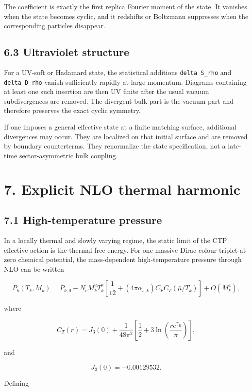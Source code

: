 \documentclass[
  10pt,
  a4paper,
]{article}
\begin{document}
The coefficient is exactly the first replica Fourier moment of the
state. It vanishes when the state becomes cyclic, and it redshifts or
Boltzmann suppresses when the corresponding particles disappear.

\subsection{6.3 Ultraviolet structure}\label{ultraviolet-structure}

For a UV-soft or Hadamard state, the statistical additions
\texttt{delta\ S\_rho} and \texttt{delta\ D\_rho} vanish sufficiently
rapidly at large momentum. Diagrams containing at least one such
insertion are then UV finite after the usual vacuum subdivergences are
removed. The divergent bulk part is the vacuum part and therefore
preserves the exact cyclic symmetry.

If one imposes a general effective state at a finite matching surface,
additional divergences may occur. They are localized on that initial
surface and are removed by boundary counterterms. They renormalize the
state specification, not a late-time sector-asymmetric bulk coupling.

\section{7. Explicit NLO thermal
harmonic}\label{explicit-nlo-thermal-harmonic}

\subsection{7.1 High-temperature
pressure}\label{high-temperature-pressure}

In a locally thermal and slowly varying regime, the static limit of the
CTP effective action is the thermal free energy. For one massive Dirac
colour triplet at zero chemical potential, the mass-dependent
high-temperature pressure through NLO can be written

\[
P_k(T_k,M_k)
=
P_{k,0}
-
N_cM_k^2T_k^2
\left[
\frac1{12}
+
(4\pi\alpha_{s,k})C_F C_T(\bar\mu/T_k)
\right]
+
O(M_k^4),
\]

where

\[
C_T(r)
=
J_3(0)
+
\frac{1}{48\pi^2}
\left[
\frac12+3\ln\left(
\frac{r e^{\gamma_E}}{\pi}
\right)
\right],
\]

and

\[
J_3(0)=-0.00129532.
\]

Defining
\end{document}
